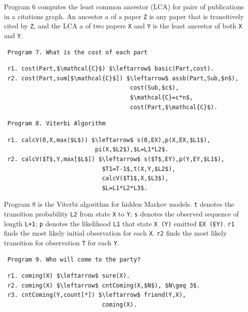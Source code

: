 \begin{appendix}
 Program 6 \cite{Wang:2015:AFR:2824032.2824052} computes the least common ancestor (LCA) for pairs of publications in a citations graph. An ancestor a of a paper \texttt{Z} is any paper that is transitively cited by \texttt{Z}, and the LCA a of two papers \texttt{X} and \texttt{Y} is the least ancestor of both \texttt{X} and \texttt{Y}.
 
 \begin{verbatim}
 Program 7. What is the cost of each part
 \end{verbatim}\vspace{-0.1in}\small
 \begin{lstlisting}
 r1. cost(Part,$\mathcal{C}$) $\leftarrow$ basic(Part,cost).
 r2. cost(Part,sum[$\mathcal{C}$]) $\leftarrow$ assb(Part,Sub,$n$),
                                    cost(Sub,$c$),
                                    $\mathcal{C}=c*n$,
                                    cost(Part,$\mathcal{C}$).
 \end{lstlisting}
 \normalsize

 \begin{verbatim}
 Program 8. Viterbi Algorithm
 \end{verbatim}\vspace{-0.1in}\small
 \begin{lstlisting}
 r1. calcV(0,X,max($L$)) $\leftarrow$ s(0,EX),p(X,EX,$L1$),
                          pi(X,$L2$),$L=L1*L2$.
 r2. calcV($T$,Y,max[$L$]) $\leftarrow$ s($T$,EY),p(Y,EY,$L1$),
                            $T1=T-1$,t(X,Y,$L2$),
                            calcV($T1$,X,$L3$),
                            $L=L1*L2*L3$.
 \end{lstlisting}
 \normalsize
 
 Program 8 \cite{7113340} is the Viterbi algorithm for hidden Markov models. \texttt{t} denotes the transition probability \texttt{L2} from state \texttt{X} to \texttt{Y}; \texttt{s} denotes the observed sequence of length \texttt{L+1}; \texttt{p} denotes the likelihood \texttt{L1} that state \texttt{X (Y)} emitted \texttt{EX (EY)}. \texttt{r1} finds the most likely initial observation for each \texttt{X}. \texttt{r2} finds the most likely transition for observation \texttt{T} for each \texttt{Y}.
 
 \begin{verbatim}
 Program 9. Who will come to the party?
 \end{verbatim}\small
 \begin{lstlisting}
 r1. coming(X) $\leftarrow$ sure(X).
 r2. coming(X) $\leftarrow$ cntComing(X,$N$), $N\geq 3$.
 r3. cntComing(Y,count[*]) $\leftarrow$ friend(Y,X),
                            coming(X).
 \end{lstlisting}
 \normalsize
 

\end{appendix}
